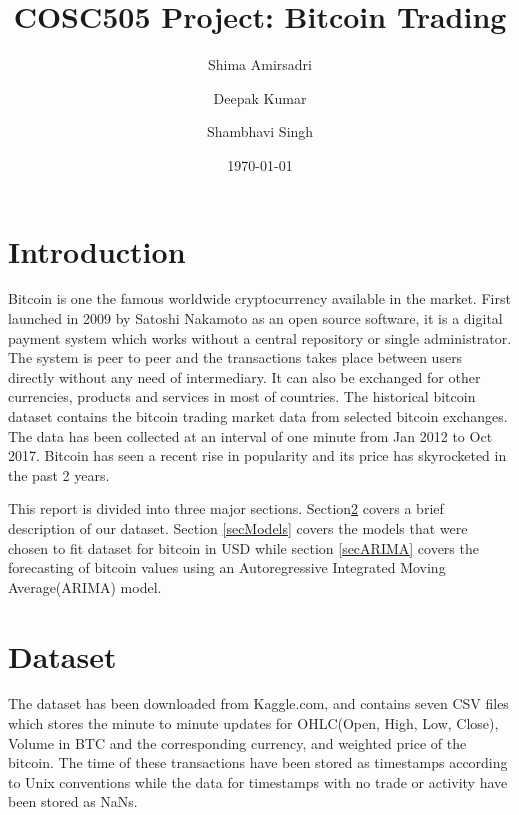 \documentclass{article}
\begin{document}


\title{COSC505 Project: Bitcoin Trading}
\author{Shima Amirsadri \and Deepak Kumar \and Shambhavi Singh} 
\date{\today}
\maketitle

\section{Introduction}
Bitcoin is one the famous worldwide cryptocurrency available in the market. First launched in 2009 by Satoshi Nakamoto as an open source software, it is a digital payment system which works without a central repository or single administrator. The system is peer to peer and the transactions takes place between users directly without any need of intermediary. It can also be exchanged for other currencies, products and services in most of countries. The historical bitcoin dataset contains the bitcoin trading market data from selected bitcoin exchanges. The data has been collected at an interval of one minute from Jan 2012 to Oct 2017. Bitcoin has seen a recent rise in popularity and its price has skyrocketed in the past 2 years. 

This report is divided into three major sections. Section\ref{secDataset} covers a brief description of our dataset. Section \ref{secModels} covers the models that were chosen to fit dataset for bitcoin in USD while section \ref{secARIMA} covers the forecasting of bitcoin values using an Autoregressive Integrated Moving Average(ARIMA) model.

\section{Dataset} \label{secDataset}
The dataset has been downloaded from Kaggle.com, and contains seven CSV files which stores the minute to minute updates for OHLC(Open, High, Low, Close), Volume in BTC and the corresponding currency, and weighted price of the bitcoin. The time of these transactions have been stored as timestamps according to Unix conventions while the data for timestamps with no trade or activity have been stored as NaNs. \\
\end{document}
